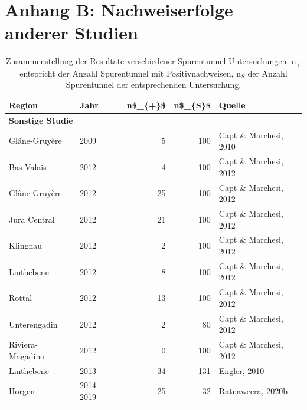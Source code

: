 \documentclass[
]{scrbook}
\begin{document}
\hypertarget{anhang-zusammenstellung}{%
\section{Anhang B: Nachweiserfolge anderer Studien}\label{anhang-zusammenstellung}}

\begin{table}

\caption{\label{tab:unnamed-chunk-9}Zusammenstellung der Resultate verschiedener Spurentunnel-Untersuchungen. n$_{+}$ entspricht der Anzahl Spurentunnel mit Positivnachweisen, n$_{S}$ der Anzahl Spurentunnel der entsprechenden Untersuchung.}
\centering
\begin{tabular}[t]{l|l|r|r|l}
\hline
Region & Jahr & n\$\_\{+\}\$ & n\$\_\{S\}\$ & Quelle\\
\hline
\multicolumn{5}{l}{\textbf{Sonstige Studie}}\\
\hline
\hspace{1em}Glâne-Gruyère & 2009 & 5 & 100 & Capt \& Marchesi, 2010\\
\hline
\hspace{1em}Bas-Valais & 2012 & 4 & 100 & Capt \& Marchesi, 2012\\
\hline
\hspace{1em}Glâne-Gruyère & 2012 & 25 & 100 & Capt \& Marchesi, 2012\\
\hline
\hspace{1em}Jura Central & 2012 & 21 & 100 & Capt \& Marchesi, 2012\\
\hline
\hspace{1em}Klingnau & 2012 & 2 & 100 & Capt \& Marchesi, 2012\\
\hline
\hspace{1em}Linthebene & 2012 & 8 & 100 & Capt \& Marchesi, 2012\\
\hline
\hspace{1em}Rottal & 2012 & 13 & 100 & Capt \& Marchesi, 2012\\
\hline
\hspace{1em}Unterengadin & 2012 & 2 & 80 & Capt \& Marchesi, 2012\\
\hline
\hspace{1em}Riviera-Magadino & 2012 & 0 & 100 & Capt \& Marchesi, 2012\\
\hline
\hspace{1em}Linthebene & 2013 & 34 & 131 & Engler, 2010\\
\hline
\hspace{1em}Horgen & 2014 - 2019 & 25 & 32 & Ratnaweera, 2020b\\

\end{tabular}
\end{table}
\end{document}
